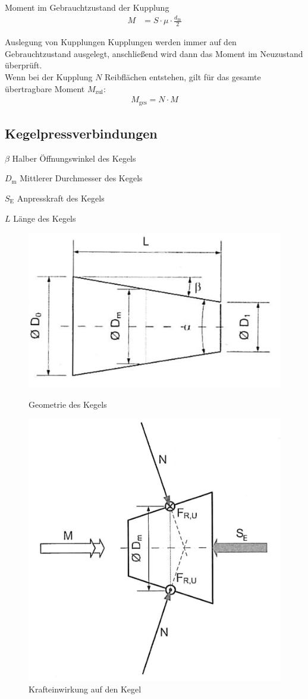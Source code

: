 \begin{eeqn}{Moment im Gebrauchtzustand der Kupplung}
	\begin{align}
		M &= S \cdot \mu \cdot \frac{d_\text{m}}{2}
	\end{align}
\end{eeqn}

\begin{eeqn}{Auslegung von Kupplungen}
	Kupplungen werden immer auf den Gebrauchtzustand ausgelegt, anschließend wird dann das Moment im Neuzustand überprüft. \\
	Wenn bei der Kupplung $N$ Reibflächen entstehen, gilt für das gesamte übertragbare Moment $M_\text{zul}$:
	\begin{align}
		M_\text{ges} = N \cdot M
	\end{align}
\end{eeqn}

\subsection{Kegelpressverbindungen}
\begin{vardef}
	\item[$\beta$] Halber Öffnungswinkel des Kegels
	\item[$D_\text{m}$] Mittlerer Durchmesser des Kegels
	\item[$S_\text{E}$] Anpresskraft des Kegels
	\item[$L$] Länge des Kegels
\end{vardef}

\begin{figure}[H]
	\centering
		\includegraphics[width=0.6\linewidth]{kupplungen/kegel-welle}
		\caption*{Geometrie des Kegels}
		\includegraphics[width=0.6\linewidth]{kupplungen/kegel-welle-frei}
		\caption*{Krafteinwirkung auf den Kegel}
\end{figure}

